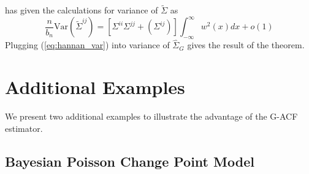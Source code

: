\documentclass[11pt]{article}
\newcommand{\Var}{\text{Var}}
\theoremstyle{remark}
\begin{document}
\cite{hannan:1970} has given the calculations for variance of $\tilde{\Sigma}$ as 
\begin{equation} \label{eq:hannan_var}
\dfrac{n}{b_n}\Var(\tilde{\Sigma}^{ij}) = \left[\Sigma^{ii}\Sigma^{jj} + \left(\Sigma^{ij} \right) \right]\int_{-\infty}^{\infty}w^2(x)dx + o(1)    
\end{equation}
Plugging (\ref{eq:hannan_var}) into variance of $\hat{\Sigma}_{G}$ gives the result of the theorem.
 

\section{Additional Examples}
We present two additional examples to illustrate the advantage of the G-ACF estimator. 
\subsection{Bayesian Poisson Change Point Model}

\end{document}

